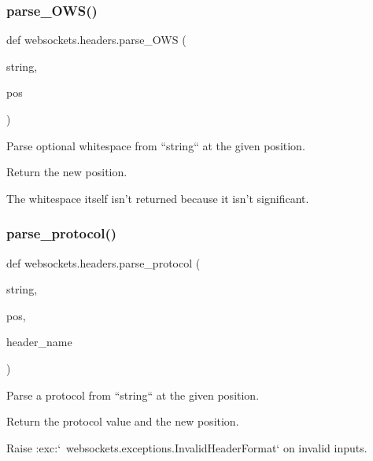 \subsubsection{\texorpdfstring{parse\+\_\+\+O\+W\+S()}{parse\_OWS()}}
{\footnotesize\ttfamily def websockets.\+headers.\+parse\+\_\+\+O\+WS (\begin{DoxyParamCaption}\item[{}]{string,  }\item[{}]{pos }\end{DoxyParamCaption})}

\begin{DoxyVerb}Parse optional whitespace from ``string`` at the given position.

Return the new position.

The whitespace itself isn't returned because it isn't significant.\end{DoxyVerb}
 \mbox{\label{namespacewebsockets_1_1headers_a396d72b69da6d8130b217f6c7d3cd3b8}} 
\subsubsection{\texorpdfstring{parse\+\_\+protocol()}{parse\_protocol()}}
{\footnotesize\ttfamily def websockets.\+headers.\+parse\+\_\+protocol (\begin{DoxyParamCaption}\item[{}]{string,  }\item[{}]{pos,  }\item[{}]{header\+\_\+name }\end{DoxyParamCaption})}

\begin{DoxyVerb}Parse a protocol from ``string`` at the given position.

Return the protocol value and the new position.

Raise :exc:`~websockets.exceptions.InvalidHeaderFormat` on invalid inputs.\end{DoxyVerb}
 \mbox{\label{namespacewebsockets_1_1headers_a48a461909e822e87a1cde3ff7299d7b2}} 
